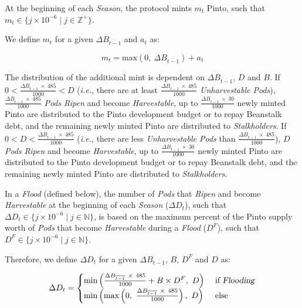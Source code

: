 \documentclass[tikz]{article}
\newcommand{\term}[1]{\textsl{#1}}
\begin{document}
At the beginning of each \term{Season}, the protocol mints $m_{t}$ Pinto, such that $m_{t} \in \{j \times 10^{-6} \mid j \in \mathbb{Z}^{+} \}$.

We define $m_{t}$ for a given $\Delta B_{\overline{t-1}}$ and $a_{t}$ as:

    $$
        m_{t} = 
            \text{max}(0,\ \Delta B_{\overline{t-1}}) + a_{t}
    $$

The distribution of the additional mint is dependent on $\Delta B_{\overline{t-1}}$, $D$ and $B$. If $0 < \frac{\Delta B_{\overline{t-1}}\ \times\ 485}{1000} < D$ (\textit{i.e.}, there are at least $\frac{\Delta B_{\overline{t-1}}\ \times\ 485}{1000}$ \term{Unharvestable Pods}), $\frac{\Delta B_{\overline{t-1}}\ \times\ 485}{1000}$ \term{Pods} \term{Ripen} and become \term{Harvestable}, up to $\frac{\Delta B_{\overline{t-1}}\ \times\ 30}{1000}$ newly minted Pinto are distributed to the Pinto development budget or to repay Beanstalk debt, and the remaining newly minted Pinto are distributed to \term{Stalkholders}. If $0 < D < \frac{\Delta B_{\overline{t-1}}\ \times\ 485}{1000}$ (\textit{i.e.}, there are less \term{Unharvestable Pods} than $\frac{\Delta B_{\overline{t-1}}\ \times\ 485}{1000}$), $D$ \term{Pods} \term{Ripen} and become \term{Harvestable}, up to $\frac{\Delta B_{\overline{t-1}}\ \times\ 30}{1000}$ newly minted Pinto are distributed to the Pinto development budget or to repay Beanstalk debt, and the remaining newly minted Pinto are distributed to \term{Stalkholders}.

In a \term{Flood} (defined below), the number of \term{Pods} that \term{Ripen} and become \term{Harvestable} at the beginning of each \term{Season} ($\Delta D_{t}$), such that $\Delta D_{t} \in \{j \times 10^{-6} \mid j \in \mathbb{N} \}$, is based on the maximum percent of the Pinto supply worth of \term{Pods} that become \term{Harvestable} during a \term{Flood} ($D^{F}$), such that $D^{F} \in \{j \times 10^{-6} \mid j \in \mathbb{N} \}$.

\begin{minipage}{\textwidth}
Therefore, we define $\Delta D_{t}$ for a given $\Delta B_{\overline{t-1}}$, $B$, $D^{F}$ and $D$ as:

    $$
        \Delta D_{t} =
            \begin{cases}
               {\text{min}\left(
                    \frac{\Delta B_{\overline{t-1}}\ \times\ 485}
                            {1000} + B \times D^{F},\ 
                        D\right)}\
                    & \text{if } \term{Flooding} \\

               {\text{min}\left(
                    \text{max}\left
                        (0,\ 
                        \frac{\Delta B_{\overline{t-1}}\ \times\ 485}
                                {1000}\right),\ 
                            D\right)}
                    & \text{else }   
            \end{cases}
    $$

\end{minipage}
\end{document}
